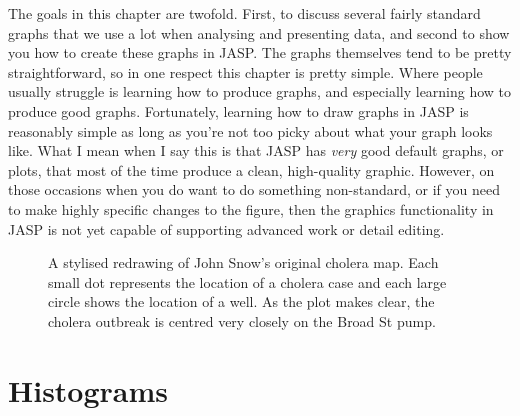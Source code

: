 The goals in this chapter are twofold. First, to discuss several fairly standard graphs that we use a lot when analysing and presenting data, and second to show you how to create these graphs in JASP. The graphs themselves tend to be pretty straightforward, so in one respect this chapter is pretty simple. Where people usually struggle is learning how to produce graphs, and especially learning how to produce good graphs. Fortunately, learning how to draw graphs in JASP is reasonably simple as long as you're not too picky about what your graph looks like. What I mean when I say this is that JASP has {\it very} good default graphs, or plots, that most of the time produce a clean, high-quality graphic. However, on those occasions when you do want to do something non-standard, or if you need to make highly specific changes to the figure, then the graphics functionality in JASP is not yet capable of supporting advanced work or detail editing. 

\begin{figure}[htb]
\begin{center}
\caption{A stylised redrawing of John Snow's original cholera map. Each small dot represents the location of a cholera case and each large circle shows the location of a well. As the plot makes clear, the cholera outbreak is centred very closely on the Broad St pump.}
\label{fig:snowmap1}
\HR
\end{center}
\end{figure}


\section{Histograms\label{sec:hist}}
 
